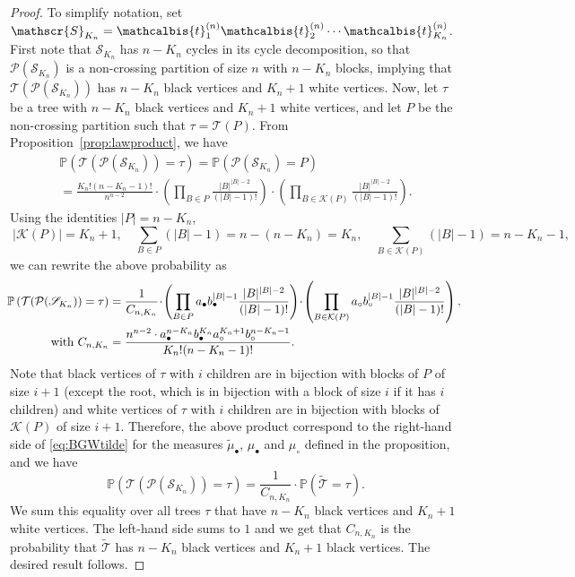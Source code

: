 \documentclass[10pt]{amsart}
\theoremstyle{definition}\newtheorem{defi}[theo]{Definition}\newtheorem{rema}[theo]{Remark}\newtheorem{exam}[theo]{Example}\newtheorem{exem}[theo]{Example}\newtheorem{nota}[theo]{Notation}
\renewcommand{\P}{\mathbb{P}}
\def\PPP{\mathcal P}
\def\tmub{\widetilde{\mu}_{\bullet}}
\def\ab{a_{\bullet}}
\def\ac{a_{\circ}}
\def\bb{b_{\bullet}}
\def\bc{b_{\circ}}
\def\mub{\mu_{\bullet}}
\def\muc{\mu_{\circ}}
\def\tb{\mathcalbis{t}}
\renewcommand\Pr[1]{\mathbb{P}\left(#1\right)}
\begin{document}
\begin{proof}
To simplify notation, set $\mathscr{S}_{K_n}= \tb_{1}^{(n)} \tb_{2}^{(n)} \cdots \tb_{K_{n}}^{(n)}$.
First note that $\mathscr{S}_{K_n}$ has $n-K_{n}$ cycles in its cycle decomposition, so that $ \PPP( \mathscr{S}_{K_n})$ is a non-crossing partition of size $n$ with $n-K_{n}$ blocks, implying that
$ \mathcal{T}( \PPP( \mathscr{S}_{K_n}))$ has $n-K_{n}$ black vertices and $K_{n}+1$ white vertices.
Now, let $\tau$ be a tree with $n-K_{n}$ black vertices and $K_{n}+1$ white vertices,
and let $P$ be the non-crossing partition such that $\tau= \mathcal{T}(P)$.
From Proposition~\ref{prop:lawproduct}, we have
\begin{multline*}
\Pr{\mathcal{T}( \PPP(\mathscr{S}_{K_n}))=\tau}= \Pr{ \PPP(\mathscr{S}_{K_n})= P} \\
=  \frac{K_{n}! (n-K_{n}-1)!}{n^{n-2}}  \cdot  \left( \prod_{B \in P} \frac{|B|^{|B|-2}}{(|B|-1)!} \right) \cdot \left(  \prod_{B \in  \mathcal{K}(P)} \frac{|B|^{|B|-2}}{(|B|-1)!} \right).
\end{multline*}
Using the identities $|P| =n-K_n$,
\[ \ |\mathcal K(P)|=K_n+1, \quad  \sum_{B \in P} (|B|-1)=n-(n-K_{n})=K_{n},  \quad
\sum_{B \in  \mathcal{K}(P)} (|B|-1)=n-K_{n}-1,\]
we can rewrite the above probability as
\begin{align*}
  \hspace{-1mm}\Pr{\mathcal{T}( \PPP(\mathscr{S}_{K_n}))=\tau}
&= \frac{1}{C_{n,K_n}} \!\cdot\! \left( \prod_{B \in P} \ab \bb^{|B|-1}\frac{|B|^{|B|-2}}{(|B|-1)!} \right)\! \cdot\! \left(  \prod_{B \in  \mathcal{K}(P)} \ac \bc^{|B|-1} \frac{|B|^{|B|-2}}{(|B|-1)!} \right),\\
\text{with }
C_{n,K_n} & =\frac{n^{n-2} \cdot \ab^{n-K_{n}} \bb^{K_{n}} \ac^{K_{n}+1} \bc^{n-K_{n}-1}}{K_{n}! (n-K_{n}-1)!}.
\end{align*}
 Note that black vertices of $\tau$ with $i$ children are in bijection with blocks of $P$ of size $i+1$ (except the root, which is in bijection with a block of size $i$ if it has $i$ children) and white vertices of $\tau$ with $i$ children are in bijection with blocks of $ \mathcal{K}(P)$ of size $i+1$. Therefore, the above product correspond to the right-hand side
 of \eqref{eq:BGWtilde} for the measures $\tmub$, $\mub$ and $\muc$ defined in the proposition,
 and we have
 \[\Pr{\mathcal{T}( \PPP(\mathscr{S}_{K_n}))=\tau}=\frac{1}{C_{n,K_n}} \cdot \P( \tilde{ \mathscr{T} }=\tau).\]
 We sum this equality over all trees $\tau$  that have $n-K_{n}$ black vertices and $K_{n}+1$ white vertices.
 The left-hand side sums to $1$ and we get that $C_{n,K_n}$
 is the probability that $\tilde{ \mathscr{T} }$
 has $n-K_n$ black vertices and $K_n+1$ black vertices.
 The desired result follows.
\end{proof}
\end{document}
